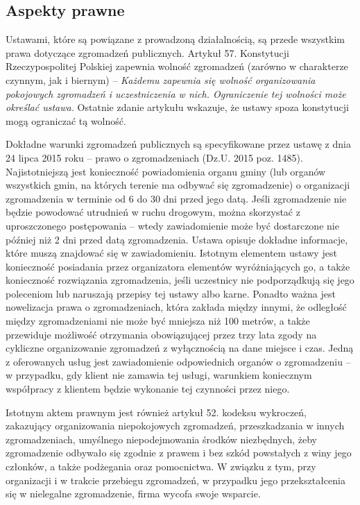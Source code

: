 \documentclass{article}
\begin{document}
\subsection{Aspekty prawne}
Ustawami, które są powiązane z prowadzoną działalnością, są przede wszystkim prawa dotyczące zgromadzeń publicznych. Artykuł 57. Konstytucji Rzeczypospolitej Polskiej zapewnia wolność zgromadzeń (zarówno w charakterze czynnym, jak i biernym) -- \textit{Każdemu zapewnia się wolność organizowania pokojowych zgromadzeń i uczestniczenia w nich. Ograniczenie tej wolności może określać ustawa.} Ostatnie zdanie artykułu wskazuje, że ustawy spoza konstytucji mogą ograniczać tą wolność. 

Dokładne warunki zgromadzeń publicznych są specyfikowane przez ustawę z dnia 24 lipca 2015 roku -- prawo o zgromadzeniach (Dz.U. 2015 poz. 1485). Najistotniejszą jest konieczność powiadomienia organu gminy (lub organów wszystkich gmin, na których terenie ma odbywać się zgromadzenie) o organizacji zgromadzenia w terminie od 6 do 30 dni przed jego datą. Jeśli zgromadzenie nie będzie powodować utrudnień w ruchu drogowym, można skorzystać z uproszczonego postępowania -- wtedy zawiadomienie może być dostarczone nie później niż 2 dni przed datą zgromadzenia. Ustawa opisuje dokładne informacje, które muszą znajdować się w zawiadomieniu. Istotnym elementem ustawy jest konieczność posiadania przez organizatora elementów wyróżniających go, a także konieczność rozwiązania zgromadzenia, jeśli uczestnicy nie podporządkują się jego poleceniom lub naruszają przepisy tej ustawy albo karne. Ponadto ważna jest nowelizacja prawa o zgromadzeniach, która zakłada między innymi, że odległość między zgromadzeniami nie może być mniejsza niż 100 metrów, a także przewiduje możliwość otrzymania obowiązującej przez trzy lata zgody na cykliczne organizowanie zgromadzeń z wyłącznością na dane miejsce i czas. 
Jedną z oferowanych usług jest zawiadomienie odpowiednich organów o zgromadzeniu -- w przypadku, gdy klient nie zamawia tej usługi, warunkiem koniecznym współpracy z klientem będzie wykonanie tej czynności przez niego.


Istotnym aktem prawnym jest również artykuł 52. kodeksu wykroczeń, zakazujący organizowania niepokojowych zgromadzeń, przeszkadzania w innych zgromadzeniach, umyślnego niepodejmowania środków niezbędnych, żeby zgromadzenie odbywało się zgodnie z prawem i bez szkód powstałych z winy jego członków, a także podżegania oraz pomocnictwa. W związku z tym, przy organizacji i w trakcie przebiegu zgromadzeń, w przypadku jego przekształcenia się w nielegalne zgromadzenie, firma wycofa swoje wsparcie. 
\end{document}

